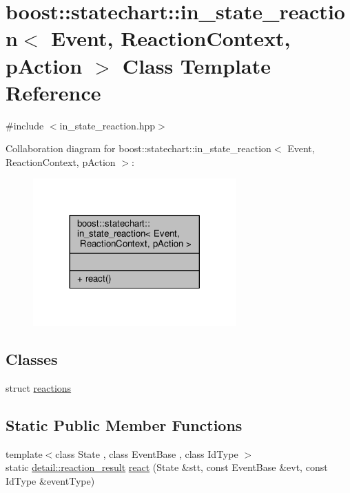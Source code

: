 \hypertarget{classboost_1_1statechart_1_1in__state__reaction}{}\section{boost\+:\+:statechart\+:\+:in\+\_\+state\+\_\+reaction$<$ Event, Reaction\+Context, p\+Action $>$ Class Template Reference}
\label{classboost_1_1statechart_1_1in__state__reaction}


{\ttfamily \#include $<$in\+\_\+state\+\_\+reaction.\+hpp$>$}



Collaboration diagram for boost\+:\+:statechart\+:\+:in\+\_\+state\+\_\+reaction$<$ Event, Reaction\+Context, p\+Action $>$\+:
\nopagebreak
\begin{figure}[H]
\begin{center}
\leavevmode
\includegraphics[width=221pt]{classboost_1_1statechart_1_1in__state__reaction__coll__graph}
\end{center}
\end{figure}
\subsection*{Classes}
\begin{DoxyCompactItemize}
\item 
struct \mbox{\hyperlink{structboost_1_1statechart_1_1in__state__reaction_1_1reactions}{reactions}}
\end{DoxyCompactItemize}
\subsection*{Static Public Member Functions}
\begin{DoxyCompactItemize}
\item 
{\footnotesize template$<$class State , class Event\+Base , class Id\+Type $>$ }\\static \mbox{\hyperlink{namespaceboost_1_1statechart_1_1detail_ab091bbb4c29327fb46ee479ea1b7255b}{detail\+::reaction\+\_\+result}} \mbox{\hyperlink{classboost_1_1statechart_1_1in__state__reaction_a148feecc17c524e2552e82362be63a19}{react}} (State \&stt, const Event\+Base \&evt, const Id\+Type \&event\+Type)
\end{DoxyCompactItemize}


